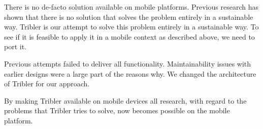

There is no de-facto solution available on mobile platforms. \cite{literature_survey}
Previous research has shown that there is no solution that solves the problem entirely in a sustainable way.
Tribler is our attempt to solve this problem entirely in a sustainable way.
To see if it is feasible to apply it in a mobile context as described above, we need to port it.

Previous attempts failed to deliver all functionality.
Maintainability issues with earlier designs were a large part of the reasons why.
We changed the architecture of Tribler for our approach.


By making Tribler available on mobile devices all research, with regard to the problems that Tribler tries to solve, now becomes possible on the mobile platform.
